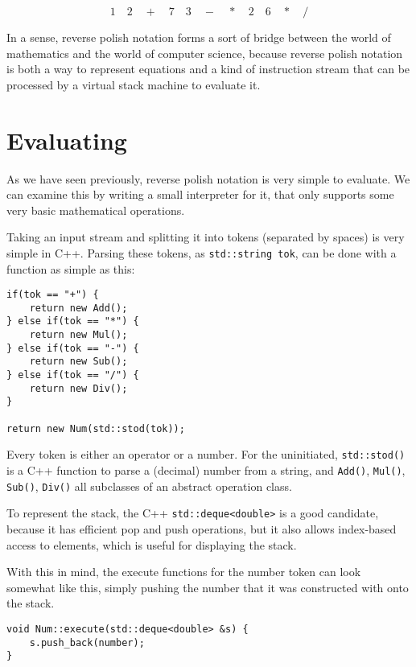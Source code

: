 \documentclass[a4paper,twocolumn]{article}
\begin{document}
\begin{equation}
1\quad2\quad+\quad7\quad3\quad-\quad*\quad2\quad6\quad*\quad/  
\end{equation}

In a sense, reverse polish notation forms a sort of bridge between the world of mathematics and the world of computer science, because reverse polish notation is both a way to represent equations and a kind of instruction stream that can be processed by a virtual stack machine to evaluate it.

\section{Evaluating}

As we have seen previously, reverse polish notation is very simple to evaluate. We can examine this by writing a small interpreter for it, that only supports some very basic mathematical operations.

Taking an input stream and splitting it into tokens (separated by spaces) is very simple in C++. Parsing these tokens, as \verb|std::string tok|, can be done with a function as simple as this:

\begin{verbatim}
if(tok == "+") {
    return new Add();
} else if(tok == "*") {
    return new Mul();
} else if(tok == "-") {
    return new Sub();
} else if(tok == "/") {
    return new Div();
}

return new Num(std::stod(tok));
\end{verbatim}

Every token is either an operator or a number. For the uninitiated, \verb|std::stod()| is a C++ function to parse a (decimal) number from a string, and \verb|Add()|, \verb|Mul()|, \verb|Sub()|, \verb|Div()| all subclasses of an abstract operation class.

To represent the stack, the C++ \verb|std::deque<double>| is a good candidate, because it has efficient pop and push operations, but it also allows index-based access to elements, which is useful for displaying the stack.

With this in mind, the execute functions for the number token can look somewhat like this, simply pushing the number that it was constructed with onto the stack.

\begin{verbatim}
void Num::execute(std::deque<double> &s) {                                                                                                                                                           
    s.push_back(number);                                                                                                                                                                                
}  
\end{verbatim}
\end{document}
